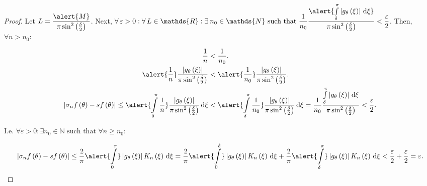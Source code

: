 \begin{frame}
	\begin{proof}
		Let
		\begin{math}
			L=
			\dfrac{
				\alert{M}
			}{
				\pi\sin^{2}\left(\frac{\delta}{2}\right)
			}
		\end{math}.
		Next,
		\begin{math}
			\displaystyle
			\forall\varepsilon>0:
			\forall L\in\mathds{R}:
			\exists n_{0}\in\mathds{N}
			\text{ such that }
			\frac{1}{n_{0}}
			\frac{
			\alert{
			\int\limits_{\delta}^{\pi}
			\left|g_{\theta}\left(\xi\right)\right|
			{\dl\xi}
			}
			}{\pi\sin^{2}\left(\frac{\delta}{2}\right)}
			<\frac{\varepsilon}{2}
		\end{math}.
		Then, $\forall n>n_{0}$:

		\begin{align*}
			\frac{1}{n}                                 & <
			\frac{1}{n_{0}}.                                \\
			\alert{\frac{1}{n}}
			\frac{
				\left|
				g_{\theta}\left(\xi\right)
				\right|
			}{\pi\sin^{2}\left(\frac{\delta}{2}\right)} & <
			\alert{\frac{1}{n_{0}}}
			\frac{
				\left|
				g_{\theta}\left(\xi\right)
				\right|
			}{\pi\sin^{2}\left(\frac{\delta}{2}\right)}.    \\
			\left|
			\sigma_{n}f\left(\theta\right)-
			sf\left(\theta\right)
			\right|\leq
			\alert{
				\int\limits_{\delta}^{\pi}
				\frac{1}{n}
			}
			\frac{
				\left|
				g_{\theta}\left(\xi\right)
				\right|
			}{
				\pi\sin^{2}\left(\frac{\delta}{2}\right)
			}
			\dl\xi
			                                            & <
			\alert{
				\int\limits_{\delta}^{\pi}
				\frac{1}{n_{0}}
			}
			\frac{
			\left|g_{\theta}\left(\xi\right)\right|
			}{\pi\sin^{2}\left(\frac{\delta}{2}\right)}
			\dl\xi=
			\frac{1}{n_{0}}
			\frac{
			\int\limits_{\delta}^{\pi}
			\left|g_{\theta}\left(\xi\right)\right|
			\dl\xi
			}{\pi\sin^{2}\left(\frac{\delta}{2}\right)}
			<\frac{\varepsilon}{2}.
		\end{align*}

		I.e.
		\begin{math}
			\forall\varepsilon>0:
			\exists n_{0}\in\mathds{N}
			\text{ such that }
			\forall n\geq n_{0}:
		\end{math}

		\begin{equation*}
			\left|
			\sigma_{n}f\left(\theta\right)-
			sf\left(\theta\right)
			\right|
			\leq
			\frac{2}{\pi}
			\alert{\int\limits_{0}^{\pi}}
			\left|
			g_{\theta}\left(\xi\right)
			\right|
			K_{n}\left(\xi\right)
			\dl\xi
			=
			\frac{2}{\pi}
			\alert{\int\limits_{0}^{\delta}}
			\left|
			g_{\theta}\left(\xi\right)
			\right|
			K_{n}\left(\xi\right)
			\dl\xi
			+
			\frac{2}{\pi}
			\alert{\int\limits_{\delta}^{\pi}}
			\left|
			g_{\theta}\left(\xi\right)
			\right|
			K_{n}\left(\xi\right)
			\dl\xi
			<\frac{\varepsilon}{2}+
			\frac{\varepsilon}{2}=
			\varepsilon.
		\end{equation*}
	\end{proof}
\end{frame}

